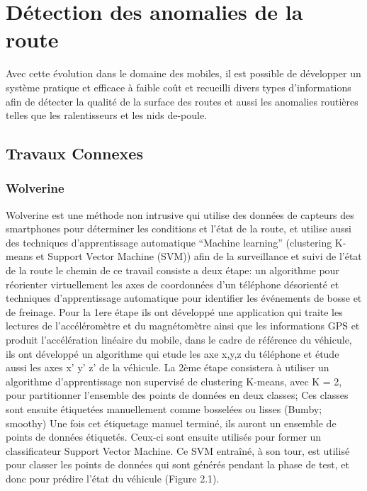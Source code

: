 
\chapter{Détection des anomalies de la route}

Avec cette évolution dans le domaine des mobiles, il est possible de développer un système pratique et efficace à faible coût et
 recueilli divers types d'informations afin de détecter la qualité de la surface des routes et aussi les anomalies routières telles
  que les ralentisseurs et les nids de-poule.

\section{Travaux Connexes}

\subsection{Wolverine}
Wolverine est \cite{bhoraskarWolverineTrafficRoad2012}une méthode non intrusive qui utilise  des données de capteurs des smartphones pour déterminer les conditions et l'état de la route, et utilise aussi des techniques d'apprentissage automatique “Machine learning” (clustering K-means et Support Vector Machine (SVM)) afin de la surveillance et suivi de l'état de la route
le chemin de ce travail consiste a deux étape: un algorithme pour réorienter virtuellement les axes de coordonnées d'un téléphone désorienté  et techniques d'apprentissage automatique pour identifier les événements de bosse et de freinage.\newline
Pour la 1ere étape ils ont développé une application qui traite les lectures de l'accéléromètre et du magnétomètre ainsi que les informations GPS et produit l'accélération linéaire du mobile, dans le cadre de référence du véhicule, ils ont développé un algorithme qui etude les axe x,y,z du téléphone et étude aussi les axes x’ y’ z’ de la véhicule.\newline
 La 2ème étape consistera à utiliser un algorithme d'apprentissage non supervisé de clustering K-means, avec K = 2, pour partitionner l'ensemble des points de données en deux classes; Ces classes sont ensuite étiquetées manuellement comme bosselées ou lisses (Bumby; smoothy)\newline
Une fois cet étiquetage manuel terminé, ils auront  un ensemble de points de données étiquetés. Ceux-ci sont ensuite utilisés pour former un classificateur Support Vector Machine. Ce SVM entraîné, à son tour, est utilisé pour classer les points de données qui sont générés pendant la phase de test, et donc pour prédire l'état du véhicule (Figure 2.1). \newline

